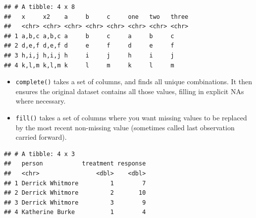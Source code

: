 \documentclass[]{book}
\newenvironment{Shaded}{\begin{snugshade}}{\end{snugshade}}
\newcommand{\CommentTok}[1]{\textcolor[rgb]{0.56,0.35,0.01}{\textit{#1}}}
\newcommand{\DecValTok}[1]{\textcolor[rgb]{0.00,0.00,0.81}{#1}}
\newcommand{\KeywordTok}[1]{\textcolor[rgb]{0.13,0.29,0.53}{\textbf{#1}}}
\newcommand{\NormalTok}[1]{#1}
\newcommand{\OperatorTok}[1]{\textcolor[rgb]{0.81,0.36,0.00}{\textbf{#1}}}
\newcommand{\OtherTok}[1]{\textcolor[rgb]{0.56,0.35,0.01}{#1}}
\newcommand{\StringTok}[1]{\textcolor[rgb]{0.31,0.60,0.02}{#1}}
\providecommand{\tightlist}{%
  \setlength{\itemsep}{0pt}\setlength{\parskip}{0pt}}
\theoremstyle{definition}
\theoremstyle{definition}
\theoremstyle{definition}
\theoremstyle{remark}
\begin{document}
\begin{verbatim}
## # A tibble: 4 x 8
##   x     x2    a     b     c     one   two   three
##   <chr> <chr> <chr> <chr> <chr> <chr> <chr> <chr>
## 1 a,b,c a,b,c a     b     c     a     b     c    
## 2 d,e,f d,e,f d     e     f     d     e     f    
## 3 h,i,j h,i,j h     i     j     h     i     j    
## 4 k,l,m k,l,m k     l     m     k     l     m
\end{verbatim}

\begin{itemize}
\tightlist
\item
  \texttt{complete()} takes a set of columns, and finds all unique
  combinations. It then ensures the original dataset contains all those
  values, filling in explicit NAs where necessary.
\item
  \texttt{fill()} takes a set of columns where you want missing values
  to be replaced by the most recent non-missing value (sometimes called
  last observation carried forward).
\end{itemize}

\begin{Shaded}
\end{Shaded}

\begin{verbatim}
## # A tibble: 4 x 3
##   person           treatment response
##   <chr>                <dbl>    <dbl>
## 1 Derrick Whitmore         1        7
## 2 Derrick Whitmore         2       10
## 3 Derrick Whitmore         3        9
## 4 Katherine Burke          1        4
\end{verbatim}
\end{document}
